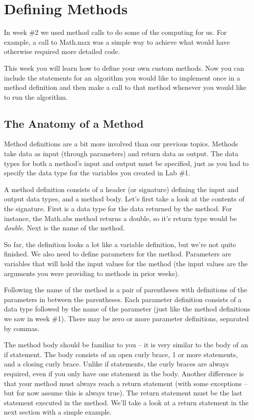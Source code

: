 \section{Defining Methods}

In week \#2 we used method calls to do some of the computing for us. For example, a call to Math.max was a simple way to achieve what would have otherwise required more detailed code. 

This week you will learn how to define your own custom methods. Now you can include the statements for an algorithm you would like to implement once in a method definition and then make a call to that method whenever you would like to run the algorithm. 

\subsection{The Anatomy of a Method}

Method definitions are a bit more involved than our previous topics. Methods take data as input (through parameters) and return data as output. The data types for both a method's input and output must be specified, just as you had to specify the data type for the variables you created in Lab \#1. 

A method definition consists of a header (or signature) defining the input and output data types, and a method body. Let's first take a look at the contents of the signature. First is a data type for the data returned by the method. For instance, the Math.abs method returns a double, so it's return type would be \textit{double}. Next is the name of the method. 

So far, the definition looks a lot like a variable definition, but we're not quite finished. We also need to define parameters for the method. Parameters are variables that will hold the input values for the method (the input values are the arguments you were providing to methods in prior weeks).

Following the name of the method is a pair of parentheses with definitions of the parameters in between the parentheses. Each parameter definition consists of a data type followed by the name of the parameter (just like the method definitions we saw in week \#1). There may be zero or more parameter definitions, separated by commas. 

The method body should be familiar to you -- it is very similar to the body of an if statement. The body consists of an open curly brace, 1 or more statements, and a closing curly brace. Unlike if statements, the curly braces are always required, even if you only have one statement in the body. Another difference is that your method must always reach a return statement (with some exceptions -- but for now assume this is always true). The return statement must be the last statement executed in the method. We'll take a look at a return statement in the next section with a simple example.

